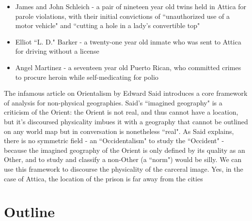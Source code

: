 \documentclass[14pt, letterpaper]{report}
\begin{document}
    \begin{itemize}
    
	    \item James and John Schleich - a pair of nineteen year old twins held in 
	    Attica for parole 
	    violations, with their initial convictions of ``unauthorized use of a motor 
	    vehicle" and ``cutting a hole in a lady's convertible top"
	    
	    \item Elliot ``L. D." Barker - a twenty-one year old inmate who was sent to 
	    Attica for driving without a license
	    
	    \item Angel Martinez - a seventeen year old Puerto Rican, who committed crimes to 
	    procure heroin while self-medicating for polio
	    
    
    \end{itemize}
    
    The infamous article on Orientalism by Edward Said \autocite{said-orientalism} 
    introduces a core framework of analysis for non-physical geographies. Said's 
    ``imagined geography" is a criticism of the Orient: the Orient is not real, 
    and thus cannot have a location, but it's discoursed physicality imbues it with 
    a geography that cannot be outlined on any world map but in conversation is 
    nonetheless ``real". As Said explains, there is no symmetric field - an ``Occidentalism" 
    to study the ``Occident" - because the imagined geography of the Orient is only 
    defined by its quality as an Other, and to study and classify a non-Other (a ``norm") 
    would be silly. \autocite[163]{said-orientalism} We can use this framework to 
    discourse the physicality of the carceral image. Yes, in the case of Attica, the 
    location of the prison is far away from the cities
	
   \section*{Outline}
	
\end{document}
